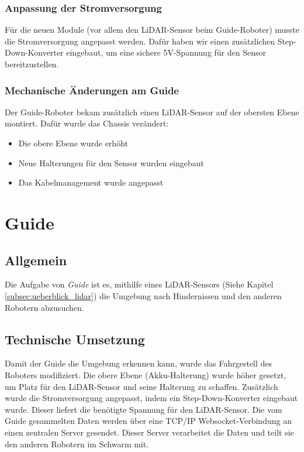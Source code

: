 \subsubsection{Anpassung der Stromversorgung}
Für die neuen Module (vor allem den LiDAR-Sensor beim Guide-Roboter) musste die Stromversorgung angepasst werden.
Dafür haben wir einen zusätzlichen Step-Down-Konverter eingebaut, um eine sichere 5V-Spannung für den Sensor bereitzustellen.

\subsubsection{Mechanische Änderungen am Guide}
Der Guide-Roboter bekam zusätzlich einen LiDAR-Sensor auf der obersten Ebene montiert.
Dafür wurde das Chassis verändert:
\begin{itemize}
    \item Die obere Ebene wurde erhöht
    \item Neue Halterungen für den Sensor wurden eingebaut
    \item Das Kabelmanagement wurde angepasst
\end{itemize}






\section{Guide}
\label{subsec:hardware_guide}
\subsection{Allgemein}
Die Aufgabe von \textit{Guide} ist es,
mithilfe eines LiDAR-Sensors (Siehe Kapitel \ref{subsec:ueberblick_lidar}) die Umgebung nach Hindernissen
und den anderen Robotern abzusuchen.
%
\subsection{Technische Umsetzung}
Damit der Guide die Umgebung erkennen kann, wurde das Fahrgestell des Roboters modifiziert. Die obere Ebene (Akku-Halterung) wurde höher gesetzt, um Platz für den LiDAR-Sensor und seine Halterung zu schaffen. Zusätzlich wurde die Stromversorgung angepasst, indem ein Step-Down-Konverter eingebaut wurde. Dieser liefert die benötigte Spannung für den LiDAR-Sensor.
%
Die vom Guide gesammelten Daten werden über eine TCP/IP Websocket-Verbindung an einen zentralen Server gesendet. Dieser Server verarbeitet die Daten und teilt sie den anderen Robotern im Schwarm mit.
%
